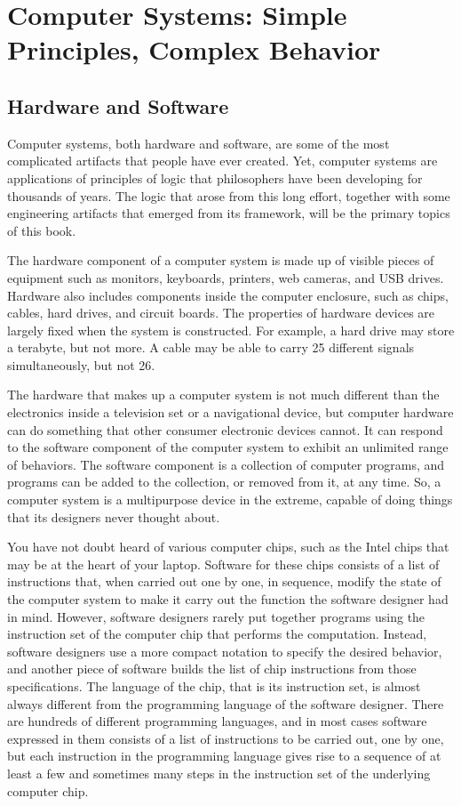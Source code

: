 \chapter[Computer Systems: Simple Principles Lead to Complex Behavior][Computer Systems]{Computer Systems: Simple Principles, Complex Behavior}

\section{Hardware and Software}

Computer systems, both hardware and software, are some of the
most complicated artifacts that people have ever created.
Yet, computer systems are
applications of principles of logic that philosophers
have been developing for thousands of years.
The logic that arose from this long effort,
together with some engineering artifacts
that emerged from its framework,
will be the primary topics of this book.

The hardware component of a computer system is made up of visible
pieces of equipment such as monitors,
keyboards, printers, web cameras, and USB drives.
Hardware also includes components inside the computer enclosure,
such as chips, cables, hard drives, and circuit boards.
The properties of hardware devices are largely fixed when the system is
constructed. For example, a hard drive may store a terabyte, but not more.
A cable may be able to carry 25 different signals
simultaneously, but not 26.

The hardware that makes up a computer system is not much different
than the electronics inside a television set or a navigational device,
but computer hardware can do something that other
consumer electronic devices cannot.
It can respond to  the software component of the computer system
to exhibit an unlimited range of behaviors.
The software component is a collection of computer programs,
and programs can be added to the collection, or removed from it,
at any time.
So, a computer system is a multipurpose device in the extreme,
capable of doing things that its designers never thought about.

You have not doubt heard of various computer chips,
such as the Intel chips that may be at the heart of your laptop.
Software for these chips consists of a list of
instructions that, when carried out one by one, in sequence,
modify the state of the computer system to make it carry out
the function the software designer had in mind.
However, software designers rarely put together programs using
the instruction set of the computer chip that performs the computation.
Instead, software designers use a more compact notation to
specify the desired behavior, and another piece of software
builds the list of chip instructions from those specifications.
The language of the chip, that is its instruction set,
is almost always different from the programming language
of the software designer.
There are hundreds of different programming languages,
and in most cases software expressed in them consists
of a list of instructions to be carried out, one by one,
but each instruction in the programming language gives
rise to a sequence of at least a few and sometimes many
steps in the instruction set of the underlying computer chip.

